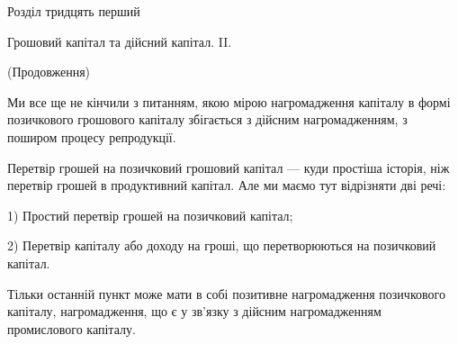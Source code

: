 Розділ тридцять перший

Грошовий капітал та дійсний капітал. II.

(Продовження)

Ми все ще не кінчили з питанням, якою мірою нагромадження капіталу в
формі позичкового грошового капіталу збігається з дійсним нагромадженням,
з поширом процесу репродукції.

Перетвір грошей на позичковий грошовий капітал — куди простіша історія,
ніж перетвір грошей в продуктивний капітал. Але ми маємо тут відрізняти дві
речі:

1) Простий перетвір грошей на позичковий капітал;

2) Перетвір капіталу або доходу на гроші, що перетворюються на позичковий
капітал.

Тільки останній пункт може мати в собі позитивне нагромадження позичкового
капіталу, нагромадження, що є у зв’язку з дійсним нагромадженням
промислового капіталу.
